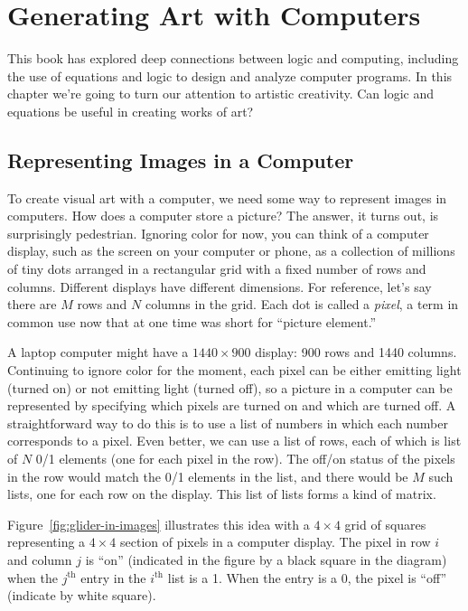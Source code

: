 \chapter{Generating Art with Computers}
\label{ch:art-computers}

This book has explored deep connections between logic
and computing, including the use of equations and logic to
design and analyze computer programs. In this chapter we're going
to turn our attention to artistic creativity. Can logic and
equations be useful in creating works of art?

\section{Representing Images in a Computer}

To create visual art with a computer, we need some way to
represent images in computers. How does a computer
store a picture?
The answer, it turns out, is surprisingly pedestrian. Ignoring
color for now, you can think of a computer display, such as the
screen on your computer or phone, as a collection of millions
of tiny dots arranged in a rectangular grid with a fixed number
of rows and columns. Different displays have different dimensions.
For reference, let's say there are $M$ rows and $N$ columns
in the grid.
Each dot is called a \emph{pixel}, a term in common use now
that at one time was short for ``picture element.''

A laptop computer might have
a $1440\times900$ display: 900 rows and 1440 columns.
Continuing to ignore color for the moment, each pixel can
be either emitting light (turned on) or not emitting light
(turned off), so a picture in a computer can be represented
by specifying which pixels are turned on and which are turned off. 
A straightforward way to do this is to use a list of
numbers in which each number corresponds to a pixel. Even better,
we can use a list of rows, each of which is list of $N$
0/1 elements (one for each pixel in the row).
The off/on status of the pixels in the row would
match the 0/1 elements in the list,
and there would be $M$ such lists, one for each row on the display.
This list of lists forms a kind of matrix.

Figure~\ref{fig:glider-in-images} illustrates
this idea with a $4\times4$ grid of squares
representing a $4\times4$ section of pixels in a computer display.
The pixel in row $i$ and column $j$ is ``on''
(indicated in the figure by a black square in the diagram)
when the $j^\text{th}$
entry in the $i^\text{th}$ list is a 1.
When the entry is a 0, the pixel is ``off'' (indicate by white square).

